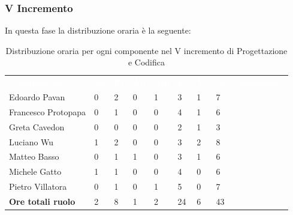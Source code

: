\subsubsection{V Incremento}
In questa fase la distribuzione oraria è la seguente:
\begin{table}[H]
\begin{center}
\renewcommand{\arraystretch}{1.25}
\begin{tabular}{ m{}<{\centering}  m{}<{\centering} m{}<{\centering} m{}<{\centering}  m{}<{\centering}  m{}<{\centering}  m{}<{\centering}  m{}<{\centering}   }
	\rowcolor{darkblue}
	\textcolor{white}{\textbf{Componente}} &\textcolor{white}{\textbf{Re}}&\textcolor{white}{\textbf{Pt}}&\textcolor{white}{\textbf{An}}&\textcolor{white}{\textbf{Am}}&\textcolor{white}{\textbf{Pr}}&\textcolor{white}{\textbf{Ve}}&\textcolor{white}{\textbf{Ore complessive}}\\ 
	Edoardo Pavan & 0 & 2 & 0 & 1 & 3 & 1 & 7 \\	
	
	Francesco Protopapa & 0 & 1 & 0 & 0 & 4 & 1 & 6 \\

	Greta Cavedon & 0 & 0 & 0 & 0 & 2 & 1 & 3 \\
	
	Luciano Wu & 1 & 2 & 0 & 0 & 3 & 2 & 8 \\
	
	Matteo Basso & 0 & 1 & 1 & 0 & 3 & 1 & 6 \\
	
	Michele Gatto & 1 & 1 & 0 & 0 & 4 & 0 & 6 \\
	
	Pietro Villatora & 0 & 1 & 0 & 1 & 5 & 0 & 7 \\
	
	\textbf{Ore totali ruolo} & 2 & 8 & 1 & 2 & 24 & 6 & 43 \\

\end{tabular}
\caption{Distribuzione oraria per ogni componente nel V incremento di Progettazione e Codifica}
\end{center}
\end{table}

